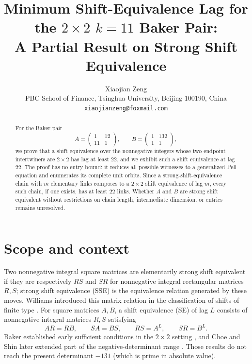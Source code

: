 \documentclass[11pt]{article}
\title{Minimum Shift-Equivalence Lag for the $2\times2$ $k=11$ Baker Pair:\\
A Partial Result on Strong Shift Equivalence}
\author{Xiaojian Zeng\\
PBC School of Finance, Tsinghua University, Beijing 100190, China\\
\texttt{xiaojianzeng@foxmail.com}}
\date{}
\begin{document}
\maketitle

\begin{abstract}
For the Baker pair
\[
A=\begin{pmatrix}1&12\\11&1\end{pmatrix},\qquad
B=\begin{pmatrix}1&132\\1&1\end{pmatrix},
\]
we prove that a shift equivalence over the nonnegative integers whose two
endpoint intertwiners are $2\times2$ has lag at least $22$, and we exhibit such
a shift equivalence at lag $22$.  The proof has no entry bound: it reduces all
possible witnesses to a generalized Pell equation and enumerates its complete
unit orbits.  Since a strong-shift-equivalence chain with $m$ elementary links
composes to a $2\times2$ shift equivalence of lag $m$, every such chain, if one
exists, has at least $22$ links.  Whether $A$ and $B$ are strong shift
equivalent without restrictions on chain length, intermediate dimension, or
entries remains unresolved.
\end{abstract}

\section{Scope and context}

Two nonnegative integral square matrices are elementarily strong shift
equivalent if they are respectively $RS$ and $SR$ for nonnegative integral
rectangular matrices $R,S$; strong shift equivalence (SSE) is the equivalence
relation generated by these moves.  Williams introduced this matrix relation
in the classification of shifts of finite type \cite{Williams1973,Williams1974}.
For square matrices $A,B$, a shift equivalence (SE) of lag $L$ consists of
nonnegative integral matrices $R,S$ satisfying
\begin{equation}\label{eq:se}
 AR=RB,\qquad SA=BS,\qquad RS=A^L,\qquad SR=B^L.
\end{equation}
Baker established early sufficient conditions in the $2\times2$ setting
\cite{Baker1983,Baker1987}, and Choe and Shin later extended part of the
negative-determinant range \cite{ChoeShin1997}.  Those results do not reach
the present determinant $-131$ (which is prime in absolute value).
\end{document}
